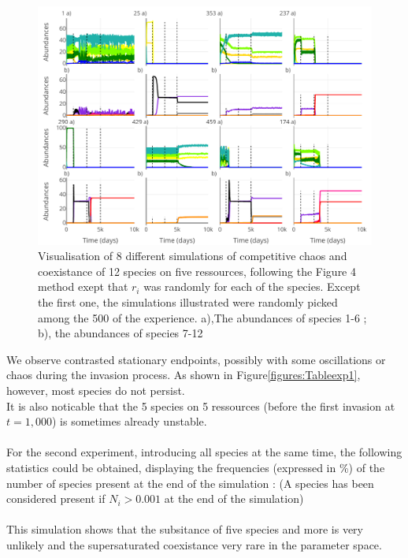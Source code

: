 \begin{figure}[H]
\begin{center} 
 \includegraphics[width=1\textwidth]{../Code/Figures/Figure_exp1.pdf}
  \caption{Visualisation of 8 different simulations of competitive chaos and coexistance of 12 species on five ressources, following the Figure 4 method exept that $r_i$ was randomly for each of the species. Except the first one, the simulations illustrated were randomly picked among the 500 of the experience. a),The abundances of species 1-6 ; b), the abundances of species 7-12}
  \label{figures:Figexp1}
\end{center}
\end{figure}
We observe contrasted stationary endpoints, possibly with some oscillations or chaos during the invasion process. As shown in Figure\ref{figures:Tableexp1}, however, most species do not persist.\\
It is also noticable that the 5 species on 5 ressources (before the first invasion at $t=1,000$) is sometimes already unstable.\\
\\
For the second experiment, introducing all species at the same time, the following statistics could be obtained, displaying the frequencies (expressed in \%) of the number of species present at the end of the simulation : (A species has been considered present if $N_i > 0.001$ at the end of the simulation) \\


\\
This simulation shows that the subsitance of five species and more is very unlikely and the supersaturated coexistance very rare in the parameter space.\\
